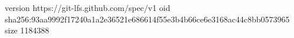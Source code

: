 version https://git-lfs.github.com/spec/v1
oid sha256:93aa9992f17240a1a2e36521e686614f55e3b4b66ce6e3168ac44c8bb0573965
size 1184388
